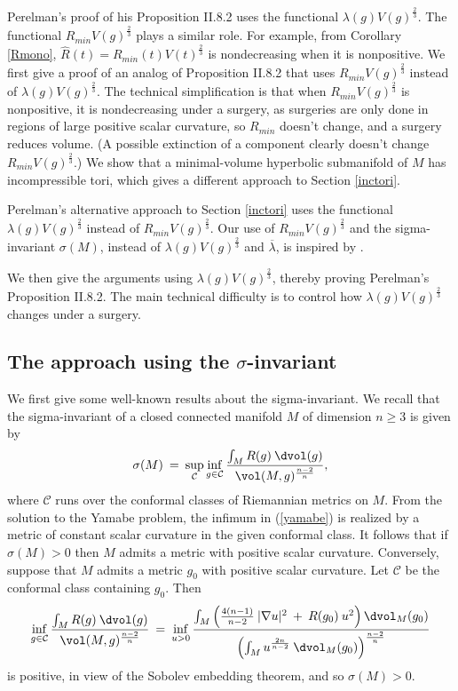 Perelman's proof of his Proposition II.8.2 uses the functional
$\lambda(g) V(g)^{\frac23}$. The functional
$R_{min} V(g)^{\frac23}$ plays a similar role.  For example, from
Corollary \ref{Rmono},
$\widehat{R}(t) = R_{min}(t) V(t)^{\frac23}$ is nondecreasing
when it is nonpositive. We first give a proof of an analog of
Proposition II.8.2 that uses $R_{min} V(g)^{\frac23}$ instead
of $\lambda(g) V(g)^{\frac23}$. The technical simplification is that
when
$R_{min} V(g)^{\frac23}$ is nonpositive, it is nondecreasing under a surgery,
as surgeries are only done in regions of large positive scalar curvature,
so $R_{min}$ doesn't change,
and a surgery reduces volume. (A possible extinction of a component
clearly doesn't change $R_{min} V(g)^{\frac23}$.)
We show that a minimal-volume hyperbolic submanifold of $M$
has incompressible tori, which gives a different approach to
Section \ref{inctori}.

Perelman's alternative approach to
Section \ref{inctori} uses the functional $\lambda(g) V(g)^{\frac23}$
instead of $R_{min} V(g)^{\frac23}$. Our use of $R_{min} V(g)^{\frac23}$ and
the sigma-invariant
$\sigma(M)$, instead of $\lambda(g) V(g)^{\frac23}$ and $\overline{\lambda}$,
is inspired by \cite{Anderson2}.

We then give the arguments using $\lambda(g) V(g)^{\frac23}$,
thereby proving Perelman's Proposition II.8.2.
The main technical difficulty is to
control how $\lambda(g) V(g)^{\frac23}$ changes under a surgery.

\subsection{The approach using the $\sigma$-invariant}

We first give some well-known results about the sigma-invariant.
We recall that the sigma-invariant of a closed connected
manifold $M$ of dimension $n \ge 3$ is given by
\begin{equation} \label{yamabe}
\sigma(M) \: = \: \sup_{{\mathcal C}} \inf_{g \in {\mathcal C}}
\frac{\int_M R(g) \: \dvol(g)}{\vol(M, g)^{\frac{n-2}{n}}},
\end{equation}
where ${\mathcal C}$ runs over the conformal classes of Riemannian
metrics on $M$.
From the solution to the Yamabe problem,
the infimum in (\ref{yamabe}) is realized by a metric of constant
scalar curvature in the given conformal class.
It follows that if $\sigma(M) > 0$ then $M$ admits a metric with
positive scalar curvature. Conversely, suppose that $M$ admits
a metric $g_0$ with positive scalar curvature. Let ${\mathcal C}$
be the conformal class containing $g_0$.  Then
\begin{equation}
\inf_{g \in {\mathcal C}}
\frac{\int_M R(g) \: \dvol(g)}{\vol(M, g)^{\frac{n-2}{n}}} \: = \:
\inf_{u > 0} \frac{
\int_M \left(
\frac{4(n-1)}{n-2} \:  |\nabla u|^2 \: + \:
R(g_0) \: u^2 \right) \dvol_M(g_0)
}{
\left( \int_M u^{\frac{2n}{n-2}} \: \dvol_M(g_0) \right)^{\frac{n-2}{n}}}
\end{equation}
is positive, in view of the Sobolev embedding theorem, and so $\sigma(M) > 0$.

